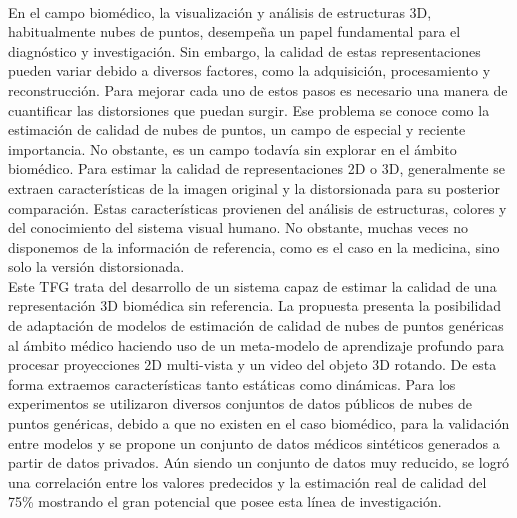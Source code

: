 \chapter*{}


% 


\thispagestyle{empty}

\begin{center}
{\large\bfseries \myTitle}\\
\end{center}
\begin{center}
\myName\\
\end{center}

\\

\\
En el campo biomédico, la visualización y análisis de estructuras 3D, 
habitualmente nubes de puntos, desempeña un papel fundamental para el diagnóstico y investigación. 
Sin embargo, la calidad de estas representaciones pueden variar debido a diversos factores, como la adquisición, procesamiento y reconstrucción. 
Para mejorar cada uno de estos pasos es necesario una manera de cuantificar las distorsiones que puedan surgir. 
Ese problema se conoce como la estimación de calidad de nubes de puntos, 
un campo de especial y reciente importancia. No obstante, 
es un campo todavía sin explorar en el ámbito biomédico.
Para estimar la calidad de representaciones 2D o 3D, generalmente se extraen características de la imagen original y la distorsionada para su posterior 
comparación. Estas características provienen del análisis de estructuras, colores y 
del conocimiento del sistema visual humano. No obstante, 
muchas veces no disponemos de la información de referencia, como es el caso en 
la medicina, sino solo la versión distorsionada.
\\

Este TFG trata del desarrollo de un sistema capaz de estimar la calidad de 
una representación 3D biomédica sin referencia. La propuesta presenta la posibilidad de 
adaptación de modelos de estimación de calidad de nubes de puntos genéricas 
al ámbito médico haciendo uso de un meta-modelo de aprendizaje profundo para 
procesar proyecciones 2D multi-vista y un video del objeto 3D rotando. 
De esta forma extraemos características tanto estáticas como dinámicas.
Para los experimentos se utilizaron diversos conjuntos de datos públicos 
de nubes de puntos genéricas, debido a que no existen en el caso biomédico, 
para la validación entre modelos y se propone un conjunto de datos médicos 
sintéticos generados a partir de datos privados. Aún siendo un conjunto de datos 
muy reducido, se logró una correlación entre los valores predecidos y la 
estimación real de calidad del 75\% mostrando el gran potencial que posee esta línea de investigación.

